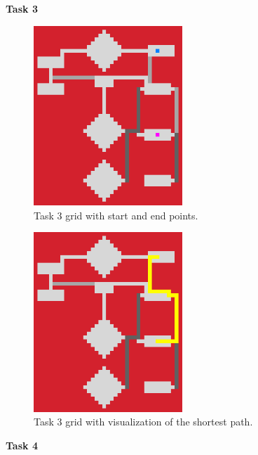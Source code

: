\documentclass{article}
\begin{document}
    \textbf{Task 3}

    \begin{figure}[H]
        \centering
        \includegraphics[width=0.5\textwidth]{Images/p2t3_start.png}
        \caption[Task 1 startgrid]{Task 3 grid with start and end points.}
        \label{fig:Task 3 startgrid}
    \end{figure}

    \begin{figure}[H]
        \centering
        \includegraphics[width=0.5\textwidth]{Images/p2t3_finish.png}
        \caption[Task 1 endgrid]{Task 3 grid with visualization of the shortest path.}
        \label{fig:Task 3 endgrid}
    \end{figure}

    \newpage

    \textbf{Task 4}
\end{document}

